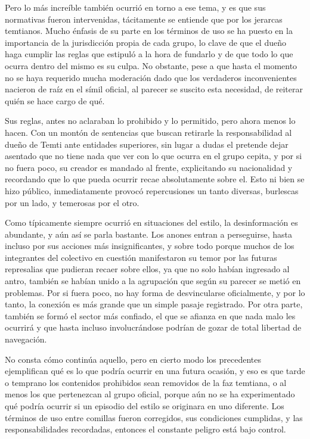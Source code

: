 \documentclass[
]{book}
\begin{document}
Pero lo más increíble también ocurrió en torno a ese tema, y es que sus normativas fueron intervenidas, tácitamente se entiende que por los jerarcas temtianos. Mucho énfasis de su parte en los términos de uso se ha puesto en la importancia de la jurisdicción propia de cada grupo, lo clave de que el dueño haga cumplir las reglas que estipuló a la hora de fundarlo y de que todo lo que ocurra dentro del mismo es su culpa. No obstante, pese a que hasta el momento no se haya requerido mucha moderación dado que los verdaderos inconvenientes nacieron de raíz en el símil oficial, al parecer se suscito esta necesidad, de reiterar quién se hace cargo de qué.

Sus reglas, antes no aclaraban lo prohibido y lo permitido, pero ahora menos lo hacen. Con un montón de sentencias que buscan retirarle la responsabilidad al dueño de Temti ante entidades superiores, sin lugar a dudas el pretende dejar asentado que no tiene nada que ver con lo que ocurra en el grupo cepita, y por si no fuera poco, su creador es mandado al frente, explicitando su nacionalidad y recordando que lo que pueda ocurrir recae absolutamente sobre el. Esto ni bien se hizo público, inmediatamente provocó repercusiones un tanto diversas, burlescas por un lado, y temerosas por el otro.

Como típicamente siempre ocurrió en situaciones del estilo, la desinformación es abundante, y aún así se parla bastante. Los anones entran a perseguirse, hasta incluso por sus acciones más insignificantes, y sobre todo porque muchos de los integrantes del colectivo en cuestión manifestaron su temor por las futuras represalias que pudieran recaer sobre ellos, ya que no solo habían ingresado al antro, también se habían unido a la agrupación que según su parecer se metió en problemas. Por si fuera poco, no hay forma de desvincularse oficialmente, y por lo tanto, la conexión es más grande que un simple pasaje registrado. Por otra parte, también se formó el sector más confiado, el que se afianza en que nada malo les ocurrirá y que hasta incluso involucrándose podrían de gozar de total libertad de navegación.

No consta cómo continúa aquello, pero en cierto modo los precedentes ejemplifican qué es lo que podría ocurrir en una futura ocasión, y eso es que tarde o temprano los contenidos prohibidos sean removidos de la faz temtiana, o al menos los que pertenezcan al grupo oficial, porque aún no se ha experimentado qué podría ocurrir si un episodio del estilo se originara en uno diferente. Los términos de uso entre comillas fueron corregidos, sus condiciones cumplidas, y las responsabilidades recordadas, entonces el constante peligro está bajo control.
\end{document}
